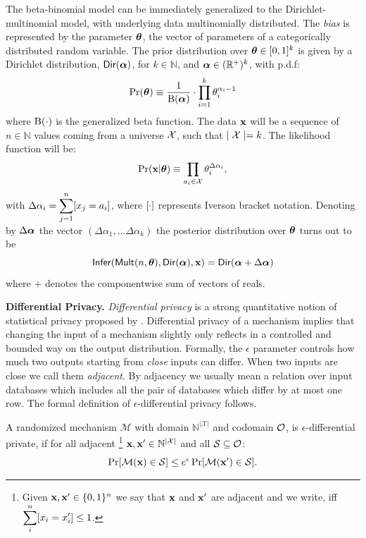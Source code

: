 \documentclass{article}
\begin{document}
The beta-binomial model can be immediately generalized to the Dirichlet-multinomial model, with underlying data multinomially distributed.
The \emph{bias} is represented by the parameter $\boldsymbol{\theta}$, the vector of parameters of a categorically distributed random variable. The prior distribution over $\boldsymbol{\theta}\in [0,1]^{k}$
is given by a Dirichlet distribution, $\mathsf{Dir}(\boldsymbol{\alpha})$, for $k\in\mathbb{N}$,
and $\boldsymbol{\alpha}\in(\mathbb{R}^{+})^{k}$, with p.d.f:
\[
  \Pr(\boldsymbol{\theta})\equiv\frac{1}{\boldsymbol{\textup{B}}(\boldsymbol{\alpha})}\cdot \displaystyle\prod_{i=1}^{k}{\theta_i^{\alpha_i-1}}
\]
where $\boldsymbol{\textup{B}}(\cdot)$ is the generalized beta function.
The data $\textbf{x}$ will be a sequence of $n\in\mathbb{N}$ values
coming from a universe $\mathcal{X}$, such that $\mid\mathcal{X} \mid=k$.
The likelihood function will be:
\[
  \Pr(\textbf{x}|\boldsymbol{\theta})\equiv \displaystyle\prod_{a_i\in\mathcal{X}}\theta_{i}^{\Delta \alpha_i},
\]
with $\Delta \alpha_i=\displaystyle\sum_{j=1}^{n}[x_j=a_i]$, where $[\cdot]$ represents Iverson bracket notation.
Denoting by $\Delta\boldsymbol{\alpha}$ the vector $(\Delta\alpha_1,\dots \Delta\alpha_k)$ the posterior distribution over $\boldsymbol{\theta}$ turns out to be
\[
   \mathsf{Infer}(\mathsf{Mult}(n, \boldsymbol{\theta}), \mathsf{Dir}(\boldsymbol{\alpha}), \textbf{x})=\mathsf{Dir}(\boldsymbol{\alpha} + \Delta \boldsymbol{\alpha}) 
\]
where $+$ denotes the componentwise sum of vectors of reals.


\noindent \textbf{Differential Privacy.}
\emph{Differential privacy} is a strong quantitative notion of statistical privacy proposed by \cite{}.
Differential privacy of a mechanism implies that changing the input of a mechanism slightly only reflects
in a controlled and bounded way on the output distribution. 
Formally, the $\epsilon$ parameter
controls how much two outputs starting from \emph{close} inputs can differ. When two inputs are close we call them \emph{adjacent}.
By adjacency we usually mean a relation over input databases which includes all the pair of databases which differ by at most one row.
The formal definition of $\epsilon$-differential privacy follows.
\begin{definition}
\label{def_epsilon_dp}

A randomized mechanism $\mathcal{M}$ with domain $\mathbb{N}^{|\mathcal{X}|}$ and codomain $\mathcal{O}$, is $\epsilon$-differential private, if for all adjacent
\footnote{Given $\textbf{x}, \textbf{x}'\in\{0,1\}^n$  we say that $\textbf{x}$ and $\textbf{x}'$ are adjacent and we write, iff
$\displaystyle \sum_{i}^{n}[x_i = x'_i ]\leq 1$. } $\textbf{x}, \textbf{x}' \in \mathbb{N}^{|\mathcal{X}|}$ and all $\mathcal{S} \subseteq \mathcal{O}$:
\begin{equation*}
\Pr[\mathcal{M}(\textbf{x}) \in \mathcal{S}] \leq e^\epsilon \Pr[\mathcal{M}(\textbf{x}') \in \mathcal{S}].
\end{equation*}

\end{definition}
\end{document}
